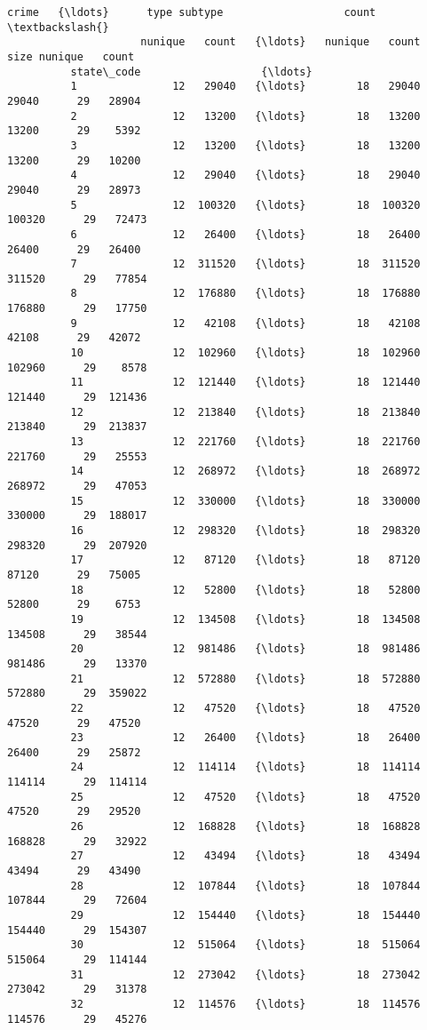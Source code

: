 \documentclass[11pt]{article}
\begin{document}
\begin{Verbatim}[commandchars=\\\{\}]
                               crime   {\ldots}      type subtype                   count  \textbackslash{}
                     nunique   count   {\ldots}   nunique   count    size nunique   count   
          state\_code                   {\ldots}                                             
          1               12   29040   {\ldots}        18   29040   29040      29   28904   
          2               12   13200   {\ldots}        18   13200   13200      29    5392   
          3               12   13200   {\ldots}        18   13200   13200      29   10200   
          4               12   29040   {\ldots}        18   29040   29040      29   28973   
          5               12  100320   {\ldots}        18  100320  100320      29   72473   
          6               12   26400   {\ldots}        18   26400   26400      29   26400   
          7               12  311520   {\ldots}        18  311520  311520      29   77854   
          8               12  176880   {\ldots}        18  176880  176880      29   17750   
          9               12   42108   {\ldots}        18   42108   42108      29   42072   
          10              12  102960   {\ldots}        18  102960  102960      29    8578   
          11              12  121440   {\ldots}        18  121440  121440      29  121436   
          12              12  213840   {\ldots}        18  213840  213840      29  213837   
          13              12  221760   {\ldots}        18  221760  221760      29   25553   
          14              12  268972   {\ldots}        18  268972  268972      29   47053   
          15              12  330000   {\ldots}        18  330000  330000      29  188017   
          16              12  298320   {\ldots}        18  298320  298320      29  207920   
          17              12   87120   {\ldots}        18   87120   87120      29   75005   
          18              12   52800   {\ldots}        18   52800   52800      29    6753   
          19              12  134508   {\ldots}        18  134508  134508      29   38544   
          20              12  981486   {\ldots}        18  981486  981486      29   13370   
          21              12  572880   {\ldots}        18  572880  572880      29  359022   
          22              12   47520   {\ldots}        18   47520   47520      29   47520   
          23              12   26400   {\ldots}        18   26400   26400      29   25872   
          24              12  114114   {\ldots}        18  114114  114114      29  114114   
          25              12   47520   {\ldots}        18   47520   47520      29   29520   
          26              12  168828   {\ldots}        18  168828  168828      29   32922   
          27              12   43494   {\ldots}        18   43494   43494      29   43490   
          28              12  107844   {\ldots}        18  107844  107844      29   72604   
          29              12  154440   {\ldots}        18  154440  154440      29  154307   
          30              12  515064   {\ldots}        18  515064  515064      29  114144   
          31              12  273042   {\ldots}        18  273042  273042      29   31378   
          32              12  114576   {\ldots}        18  114576  114576      29   45276   
          

\end{Verbatim}
\end{document}
